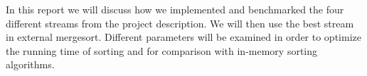 In this report we will discuss how we implemented and benchmarked the four different streams from the project description. We will then use the best stream in external mergesort. Different parameters will be examined in order to optimize the running time of sorting and for comparison with in-memory sorting algorithms.